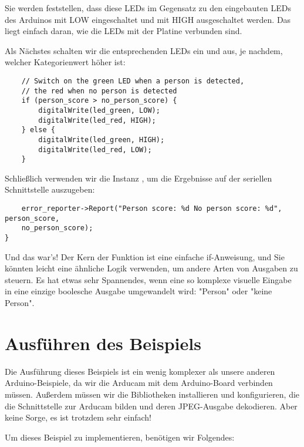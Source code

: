     Sie werden feststellen, dass diese LEDs im Gegensatz zu den eingebauten LEDs des Arduinos mit LOW eingeschaltet und mit HIGH ausgeschaltet werden. Das liegt einfach daran, wie die LEDs mit der Platine verbunden sind.

Als Nächstes schalten wir die entsprechenden LEDs ein und aus, je nachdem, welcher Kategorienwert höher ist:
    
\begin{code}
    \begin{lstlisting}
    // Switch on the green LED when a person is detected,
    // the red when no person is detected
    if (person_score > no_person_score) {
        digitalWrite(led_green, LOW);
        digitalWrite(led_red, HIGH);
    } else {
        digitalWrite(led_green, HIGH);
        digitalWrite(led_red, LOW);
    }
  \end{lstlisting}
\end{code}

    Schließlich verwenden wir die Instanz , um die Ergebnisse auf der seriellen Schnittstelle auszugeben:
    
\begin{code}
    \begin{lstlisting}
    error_reporter->Report("Person score: %d No person score: %d", person_score,
    no_person_score);
}
  \end{lstlisting}
\end{code}

Und das war's! Der Kern der Funktion ist eine einfache if-Anweisung, und Sie könnten leicht eine ähnliche Logik verwenden, um andere Arten von Ausgaben zu steuern. Es hat etwas sehr Spannendes, wenn eine so komplexe visuelle Eingabe in eine einzige boolesche Ausgabe umgewandelt wird: "Person" oder "keine Person".

\section{Ausführen des Beispiels}

Die Ausführung dieses Beispiels ist ein wenig komplexer als unsere anderen Arduino-Beispiele, da wir die Arducam mit dem Arduino-Board verbinden müssen. Außerdem müssen wir die Bibliotheken installieren und konfigurieren, die die Schnittstelle zur Arducam bilden und deren JPEG-Ausgabe dekodieren. Aber keine Sorge, es ist trotzdem sehr einfach!

Um dieses Beispiel zu implementieren, benötigen wir Folgendes:

